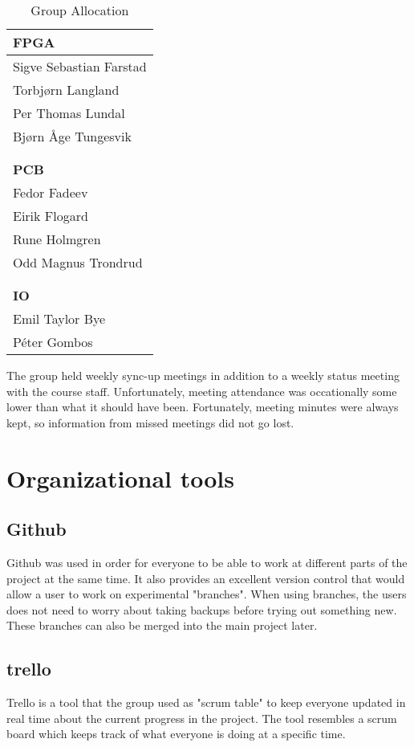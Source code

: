 \begin{table}[H]
\begin{center}
\begin{tabular}{l}
\textbf{FPGA} \\
\hline
Sigve Sebastian Farstad \\
Torbjørn Langland \\
Per Thomas Lundal \\
Bjørn Åge Tungesvik \\
\\
\\
\textbf{PCB} \\
\hline
Fedor Fadeev \\
Eirik Flogard \\
Rune Holmgren \\
Odd Magnus Trondrud \\
\\
\\
\textbf{IO} \\
\hline
Emil Taylor Bye \\
Péter Gombos \\
\end{tabular}
\caption{Group Allocation}
\label{table:group-allocation}
\end{center}
\end{table}

The group held weekly sync-up meetings in addition to a weekly status meeting with the course staff.
Unfortunately, meeting attendance was occationally some lower than what it should have been.
Fortunately, meeting minutes were always kept, so information from missed meetings did not go lost.

\section{Organizational tools}
\subsection{Github}
Github was used in order for everyone to be able to work at different parts of the project at the same time.
It also provides an excellent version control that would allow a user to work on experimental "branches". When using 
branches, the users does not need to worry about taking backups before trying out something new. These branches can also be merged into the main project later.
\subsection{trello}
Trello is a tool that the group used as "scrum table" to keep everyone updated in real time about the current progress in the project.
The tool resembles a scrum board which keeps track of what everyone is doing at a specific time.

